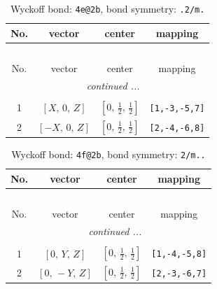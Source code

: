 \documentclass[fleqn,8pt]{jsarticle}
\begin{document}
\renewcommand{\arraystretch}{1.2}
\begin{longtable}{cccc}
\caption{Wyckoff bond: {\tt 4e@2b}, bond symmetry: {\tt .2/m.}}
 \\
 \hline \hline
No. & vector & center & mapping \\ \hline \endfirsthead

\multicolumn{3}{l}{\tablename\ \thetable{}} \\
 \hline \hline
No. & vector & center & mapping \\ \hline \endhead

 \hline \hline
\multicolumn{3}{r}{\footnotesize\it continued ...} \\ \endfoot

 \hline \hline
\multicolumn{3}{r}{} \\ \endlastfoot

1 & $\left[ X,\, 0,\, Z \right]$ & $\left[ 0,\, \frac{1}{2},\, \frac{1}{2} \right]$ & {\tt [1,-3,-5,7]} \\ \hline
2 & $\left[ - X,\, 0,\, Z \right]$ & $\left[ 0,\, \frac{1}{2},\, \frac{1}{2} \right]$ & {\tt [2,-4,-6,8]} \\
\end{longtable}
\renewcommand{\arraystretch}{1.2}
\begin{longtable}{cccc}
\caption{Wyckoff bond: {\tt 4f@2b}, bond symmetry: {\tt 2/m..}}
 \\
 \hline \hline
No. & vector & center & mapping \\ \hline \endfirsthead

\multicolumn{3}{l}{\tablename\ \thetable{}} \\
 \hline \hline
No. & vector & center & mapping \\ \hline \endhead

 \hline \hline
\multicolumn{3}{r}{\footnotesize\it continued ...} \\ \endfoot

 \hline \hline
\multicolumn{3}{r}{} \\ \endlastfoot

1 & $\left[ 0,\, Y,\, Z \right]$ & $\left[ 0,\, \frac{1}{2},\, \frac{1}{2} \right]$ & {\tt [1,-4,-5,8]} \\ \hline
2 & $\left[ 0,\, - Y,\, Z \right]$ & $\left[ 0,\, \frac{1}{2},\, \frac{1}{2} \right]$ & {\tt [2,-3,-6,7]} \\
\end{longtable}
\renewcommand{\arraystretch}{1.2}
\end{document}
